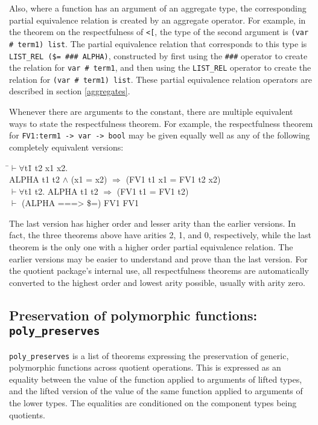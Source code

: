 \documentclass[envcountsame,runningheads]{llncs}
\newcommand{\quotient}{partial equivalence}
\begin{document}
Also, where a function has an argument of an aggregate type,
the corresponding \quotient{} relation is created by an aggregate operator. 
For example, in the theorem on the respectfulness of 
{\tt <[}, the
type of the second argument is
{\tt (var \# term1) list}. 
The
\quotient{}
relation that corresponds to this type is
{\tt LIST\_REL (\$= \#\#\# ALPHA)},
constructed by first
using the {\tt \#\#\#} operator to create the
relation for
{\tt var \# term1},
and then using the {\tt LIST\_REL}
operator to create the
relation for
{\tt (var \# term1) list}.
These \quotient{} relation operators
are described in section \ref{aggregates}.

Whenever there are arguments to the constant, there are
multiple equivalent ways to state the respectfulness theorem.
For example, the respectfulness theorem for {\tt FV1:term1 -> var -> bool} may be given
equally well as any of the following completely equivalent versions:
{\tt \begin{tabbing}
\hspace{5.5mm}
    \=$\vdash \forall$t\=1 t2 x1 x2. \\
\>\>     ALPHA t1 t2 $\wedge$ (x1 = x2) $\Rightarrow$ (FV1 t1 x1 = FV1 t2 x2) \\
\>  $\vdash \forall$t1 t2. ALPHA t1 t2 $\Rightarrow$ (FV1 t1 = FV1 t2) \\
\>  $\vdash$ (ALPHA ===> \$=) FV1 FV1
\end{tabbing}}
The last version has higher order and lesser arity than the
earlier versions.  In fact, the three theorems above have arities
2, 1, and 0, respectively,
while the last theorem is the only one with a
higher order \quotient{} relation.
The earlier versions may be easier to understand and prove than the
last version.  For the quotient package's internal use, all respectfulness
theorems are automatically converted to the highest order and lowest
arity possible, usually with arity zero.


%
\subsection{
Preservation
of polymorphic functions: {\tt poly\_preserves}}
%
\label{polypreserves}

{\tt poly\_preserves} is a list of theorems expressing the preservation
of generic, polymorphic functions across quotient operations.
This is expressed as an
equality between the value of the function applied to arguments of
lifted types, and the lifted version of the value of the same function
applied to arguments of the lower types. 
The equalities are conditioned on the component types being quotients.
\end{document}
